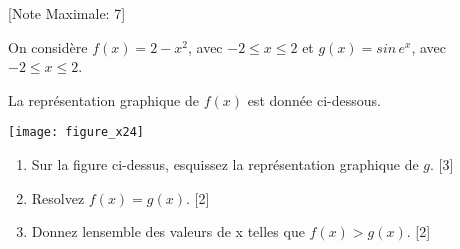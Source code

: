 \begin{question}
  \hspace*{\fill} [Note Maximale: 7]\par
  \medskip
  \noindent On considère $f(x) = 2 - x^2$, avec $-2 \le x \le 2$ et $g(x)= sin\,e^x$, avec $-2 \le x \le 2$.\par
  \medskip
  \begin{center} %
    \noindent La représentation graphique de $f(x)$ est donnée ci-dessous.\par
    \texttt{[image: figure\_x24]}\par
  \end{center} %
  \begin{enumerate}[label=(\alph*)]
    \item Sur la figure ci-dessus, esquissez la représentation graphique de $g$.\hspace*{\fill} [3]
    \item Resolvez $f(x) = g(x)$.\hspace*{\fill} [2]
    \item Donnez lensemble des valeurs de x telles que $f(x) > g(x)$.\hspace*{\fill} [2]
  \end{enumerate}
\end{question}

